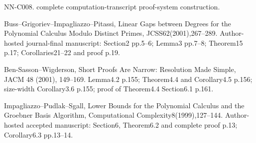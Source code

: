 NN-C008. complete computation-transcript proof-system construction.

Buss--Grigoriev--Impagliazzo--Pitassi, Linear Gaps between Degrees for the Polynomial Calculus Modulo Distinct Primes, JCSS62(2001),267--289. Author-hosted journal-final manuscript: Section2 pp.5--6; Lemma3 pp.7--8; Theorem15 p.17; Corollaries21--22 and proof p.19.

Ben-Sasson--Wigderson, Short Proofs Are Narrow: Resolution Made Simple, JACM 48 (2001), 149--169. Lemma4.2 p.155; Theorem4.4 and Corollary4.5 p.156; size-width Corollary3.6 p.155; proof of Theorem4.4 Section6.1 p.161.

Impagliazzo--Pudlak--Sgall, Lower Bounds for the Polynomial Calculus and the Groebner Basis Algorithm, Computational Complexity8(1999),127--144. Author-hosted accepted manuscript: Section6, Theorem6.2 and complete proof p.13; Corollary6.3 pp.13--14.

